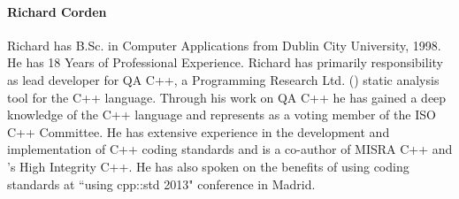 \documentclass[a4paper,11pt]{article}
\begin{document}

\paragraph{Richard Corden}
Richard has B.Sc. in Computer Applications from Dublin City University, 1998.
He has 18 Years of Professional Experience.
Richard has primarily responsibility as lead developer for QA C++, a Programming Research Ltd. (\PRshort{}) static analysis tool for the C++ language.  Through his work on QA C++ he has gained a deep knowledge of the C++ language and represents \PRshort{} as a voting member of the ISO C++ Committee.  He has extensive experience in the development and implementation of C++ coding standards and is a co-author of MISRA C++ and \PRshort{}'s High Integrity C++.  He has also spoken on the benefits of using coding standards at ``using cpp::std 2013" conference in Madrid.

\end{document}
